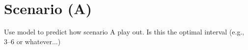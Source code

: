 \chapter{Scenario (A)}\label{ch:scenarioA} 
Use model to predict how scenario A play out. Is this the optimal interval (e.g., 3--6 or whatever...) 